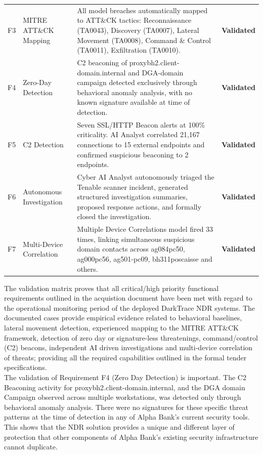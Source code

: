\documentclass[12pt,a4paper]{report}
\begin{document}
\begin{xltabular}{\textwidth}{c >{\raggedright\arraybackslash}p{3.8cm} >{\raggedright\arraybackslash}X c}
    F3 & MITRE ATT\&CK Mapping & 
    All model breaches automatically mapped to ATT\&CK tactics: Reconnaissance (TA0043), Discovery (TA0007), Lateral Movement (TA0008), Command \& Control (TA0011), Exfiltration (TA0010). & 
    {\textbf{Validated}} \\
    
    F4 & Zero-Day Detection & 
    C2 beaconing of proxybh2.client-domain.internal and DGA-domain campaign detected exclusively through behavioral anomaly analysis, with no known signature available at time of detection. & 
    {\textbf{Validated}} \\
    
    F5 & C2 Detection & 
    Seven SSL/HTTP Beacon alerts at 100\% criticality. AI Analyst correlated 21,167 connections to 15 external endpoints and confirmed suspicious beaconing to 2 endpoints. & 
    {\textbf{Validated}} \\
    
    F6 & Autonomous Investigation & 
    Cyber AI Analyst autonomously triaged the Tenable scanner incident, generated structured investigation summaries, proposed response actions, and formally closed the investigation. & 
    {\textbf{Validated}} \\
    
    F7 & Multi-Device Correlation & 
    Multiple Device Correlations model fired 33 times, linking simultaneous suspicious domain contacts across ag084pc50, ag000pc56, ag501-pc09, bh311poscaisse and others. & 
    {\textbf{Validated}} \\
    
\end{xltabular}

The validation matrix proves that all critical/high priority functional requirements outlined in the acquistion document have been met with regard to the operational monitoring period of the deployed DarkTrace NDR systems. The documented cases provide empirical evidence related to behavioral baselines, lateral movement detection, experienced mapping to the MITRE ATT\&CK framework, detection of zero day or signature-less threatenings, command/control (C2) beacons, independent AI driven investigations and multi-device correlation of threats; providing all the required capabilities outlined in the formal tender specifications.\\

The validation of Requirement F4 (Zero Day Detection) is important. The C2 Beaconing activity for proxybh2.client-domain.internal, and the DGA domain Campaign observed across multiple workstations, was detected only through behavioral anomaly analysis. There were no signatures for these specific threat patterns at the time of detection in any of Alpha Bank's current security tools. This shows that the NDR solution provides a unique and different layer of protection that other components of Alpha Bank's existing security infrastructure cannot duplicate.
\end{document}
